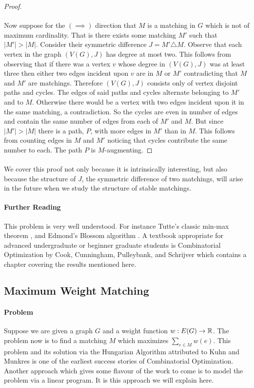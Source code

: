 \begin{proof}
\paragraph{}
Now suppose for the $(\implies)$ direction that $M$ is a matching in $G$ which is not of maximum cardinality. That is there exists some matching $M'$ such that $|M'| > |M|$. Consider their symmetric difference $J = M' \triangle M$. Observe that each vertex in the graph $(V(G), J)$ has degree at most two. This follows from observing that if there was a vertex $v$ whose degree in $(V(G), J)$ was at least three then either two edges incident upon $v$ are in $M$ or $M'$ contradicting that $M$ and $M'$ are matchings. Therefore $(V(G), J)$ consists only of vertex disjoint paths and cycles. The edges of said paths and cycles alternate belonging to $M'$ and to $M$. Otherwise there would be a vertex with two edges incident upon it in the same matching, a contradiction. So the cycles are even in number of edges and contain the same number of edges from each of $M'$ and $M$. But since $|M'| > |M|$ there is a path, $P$, with more edges in $M'$ than in $M$. This follows from counting edges in $M$ and $M'$ noticing that cycles contribute the same number to each. The path $P$ is $M$-augmenting.
\end{proof}
\paragraph{}
We cover this proof not only because it is intrinsically interesting, but also because the structure of $J$, the symmetric difference of two matchings, will arise in the future when we study the structure of stable matchings.
\paragraph{Further Reading}
This problem is very well understood. For instance Tutte's classic min-max theorem \cite{tutte1947factorization}, and Edmond's Blossom algorithm \cite{edmonds1965paths}. A textbook appropriate for advanced undergraduate or beginner graduate students is Combinatorial Optimization by Cook, Cunningham, Pulleybank, and Schrijver \cite{cook2009combinatorial} which contains a chapter covering the results mentioned here.
\subsection{Maximum Weight Matching}\label{GT:MWM}
\paragraph{Problem} Suppose we are given a graph $G$ and a weight function $w : E(G) \rightarrow \mathbb{R}$. The problem now is to find a matching $M$ which maximizes $\sum_{e \in M} w(e)$. This problem and its solution via the Hungarian Algorithm attributed to Kuhn and Munkres \cite{kuhn1955hungarian}\cite{munkres1957algorithms} is one of the earliest success stories of Combinatorial Optimization. Another approach which gives some flavour of the work to come is to model the problem via a linear program. It is this approach we will explain here.

